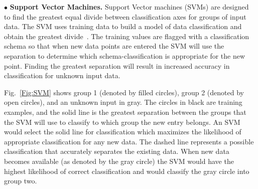 \documentclass[conference]{IEEEtran}
\begin{document}
%

$\bullet$ {\bf Support Vector Machines.}
Support Vector machines (SVMs) are designed to find the greatest equal divide between classification axes for groups of input data. The SVM uses training data to build a model of data classification and obtain the greatest divide~\cite{Hoffert:10}. The training values are flagged with a classification schema so that when new data points are entered the SVM will use the separation to determine which schema-classification is appropriate for the new point. Finding the greatest separation will result in increased accuracy in classification for unknown input data.

	Fig.~\ref{Fig:SVM} shows group 1 (denoted by filled circles), group 2 (denoted by open circles), and an unknown input in gray. The circles in black are training examples, and the solid line is the greatest separation between the groups that the SVM will use to classify to which group the new entry belongs. An SVM would select the solid line for classification which maximizes the likelihood of appropriate classification for any new data. The dashed line represents a possible classification that accurately separates the existing data. When new data becomes available (as denoted by the gray circle) the SVM would have the highest likelihood of correct classification and would classify the gray circle into group two.
\end{document}
